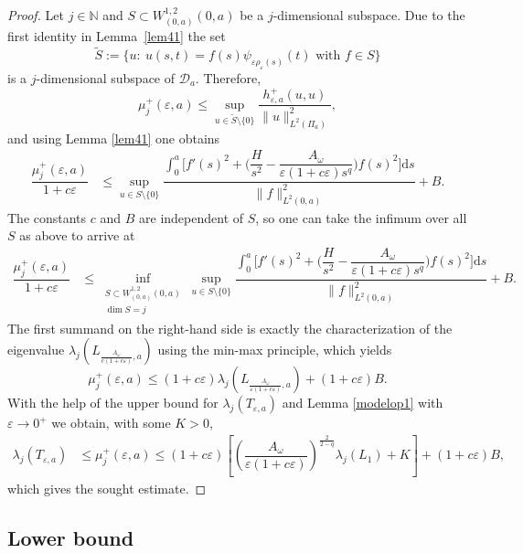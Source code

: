 \documentclass[11pt,oneside,reqno,a4paper]{amsart}
\renewcommand{\Tilde}{\widetilde}
\newcommand{\dd}{\mathrm{d}}
\newcommand{\cD}{\mathcal{D}}
\newcommand{\N}{\mathbb{N}}
\newcommand{\eps}{\varepsilon}
\theoremstyle{definition}
\begin{document}
\begin{proof}
Let $j\in \N$ and $S\subset W^{1,2}_{(0,a)}(0,a)$ be a $j$-dimensional subspace. Due to the first identity in Lemma~\ref{lem41} the set
\[
\Tilde S:=\Big\{ u:\  u(s,t)=f(s)\psi_{\eps \rho_\eps(s)}(t) \text{ with }f\in S\Big\}
\]
is a $j$-dimensional subspace of $\cD_a$. Therefore,
\[
\mu_j^+(\eps,a)\le \sup_{u\in \Tilde S\setminus\{0\}}\dfrac{h^+_{\eps,a}(u,u)}{\|u\|^2_{L^2(\Pi_a)}},
\]
and using Lemma \ref{lem41} one obtains
\begin{align*}
\dfrac{\mu_j^+(\eps,a)}{1+c\eps}&\le	\sup_{u\in S\setminus\{0\}}\dfrac{\displaystyle\int_0^a \bigg[f'(s)^2 +\bigg(\dfrac{H}{s^2}-\dfrac{A_\omega}{\eps(1+c\eps)s^q}\bigg)f(s)^2\bigg]\dd s}{\|f\|^2_{L^2(0,a)}}+B.
\end{align*}
The constants $c$ and $B$ are independent of $S$, so one can take the infimum over all $S$ as above 
to arrive at
\begin{align*}
	\dfrac{\mu_j^+(\eps,a)}{1+c\eps}&\le	\inf_{\substack{S\subset W^{1,2}_{(0,a)}(0,a)\\ \dim S=j}}\sup_{u\in S\setminus\{0\}}\dfrac{\displaystyle\int_0^a \bigg[f'(s)^2 +\bigg(\dfrac{H}{s^2}-\dfrac{A_\omega}{\eps(1+c\eps)s^q}\bigg)f(s)^2\bigg]\dd s}{\|f\|^2_{L^2(0,a)}} + B.
\end{align*}
The first summand on the right-hand side is exactly the characterization of the eigenvalue $\lambda_j\left(L_{\frac{A_\omega}{c(1+c\eps)},a}\right)$ using the min-max principle, which yields
\[
\mu_j^+(\eps,a)\le (1+c\eps)\lambda_j\left(L_{\frac{A_\omega}{\eps(1+c\eps)},a}\right)+(1+c\eps)B.
\]
With the help of the upper bound for $\lambda_j(T_{\eps,a})$ and Lemma \ref{modelop1} with $\eps\to 0^+$ we obtain, with some $K>0$,
\begin{align*}
\lambda_j(T_{\eps,a})&\le \mu_j^+(\eps,a)
\le (1+c\eps)\left[\left(\dfrac{A_\omega}{\eps(1+c\eps)}\right)^{\frac{2}{2-q}} \lambda_j(L_1)+K\right]+(1+c\eps)B,
\end{align*}
which gives the sought estimate.	
\end{proof}


\subsection{Lower bound}
\end{document}
